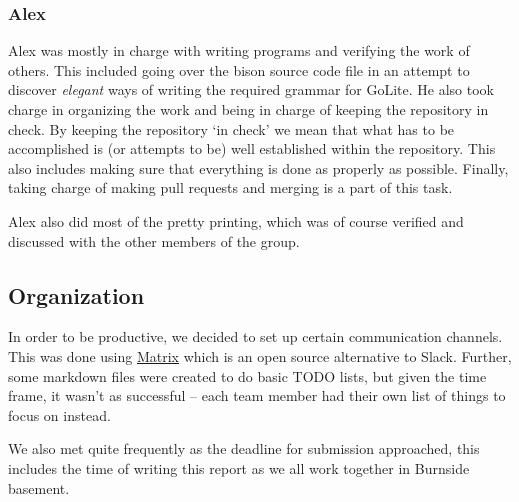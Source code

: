 \documentclass{article}
\begin{document}
\subsubsection{Alex}

Alex was mostly in charge with writing programs and verifying the work of
others. This included going over the bison source code file in an attempt to discover
\textit{elegant} ways of writing the required grammar for GoLite. He also took
charge in organizing the work and being in charge of keeping the repository in check.
By keeping the repository `in check' we mean that what has to be accomplished is
(or attempts to be) well established within the repository. This also includes
making sure
that everything is done as properly as possible. Finally, taking charge
of making pull requests and merging is a part of this task.

Alex also did most of the pretty printing, which was of course verified and
discussed with the other members of the group.

\subsection{Organization}

In order to be productive, we decided to set up certain communication channels.
This was done using \href{https://matrix.org/}{Matrix} which is an open source
alternative to Slack. Further, some markdown files were created to do basic
TODO lists, but given the time frame, it wasn't as successful -- each team
member had their own list of things to focus on instead.

We also met quite frequently as the deadline for submission approached, this
includes the time of writing this report as we all work together in Burnside
basement.

\nocite{*}

{}

\end{document}
